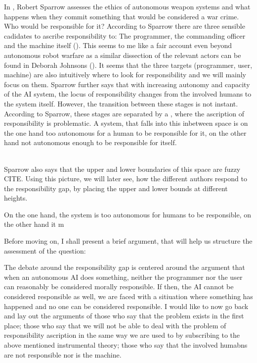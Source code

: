 \documentclass{article}
\begin{document}
In , Robert Sparrow assesses the ethics of
autonomous weapon systems and what happens when they commit something that would
be considered a war crime. Who would be responsible for it? According to Sparrow
there are three sensible cadidates to ascribe responsibility to: The programmer,
the commanding officer and the machine itself (\cite[p.
69-71]{sparrow2007killer}). This seems to me like a fair account even beyond
autonomous robot warfare as a similar dissection of the relevant actors can be
found in Deborah Johnsons  (\cite[p.
202]{johnson2006computer}). It seems that the three targets (programmer, user,
machine) are also intuitively where to look for responsibility and we will mainly
focus on them. Sparrow further says that with increasing autonomy and capacity
of the AI system, the locus of responsibility changes from the involved humans
to the system itself. However, the transition between these stages is not
instant. According to Sparrow, these stages are separated by a , where the ascription of responsibility is problematic. A system, that
falls into this inbetween space is on the one hand too autonomous for a human to
be responsible for it, on the other hand not autonomous enough to be responsible
for itself.\\

\\

Sparrow also says that the upper and lower boundaries of this space are fuzzy
CITE. Using this picture, we will later see, how the different authors respond
to the responsibility gap, by placing the upper and lower bounds at different
heights.

On the one hand,
the system is too autonomous for humans to be responsible, on the other hand it
m



Before moving on, I shall present a brief argument, that will help us structure
the assessment of the question:

The debate around the responsibility gap is centered around the argument that
when an autonomous AI does something, neither the programmer nor the user can
reasonably be considered morally responsible. If then, the AI cannot be
considered responsible as well, we are faced with a sitiuation where something
has happened and no one can be considered responsible. I would like to now go
back and lay out the arguments of those who say that the problem exists in the
first place; those who say that we will not be able to deal with the problem of
responsibility ascription in the same way we are used to by subscribing to the
above mentioned instrumental theory; those who say that the involved humabns are
not responsible nor is the machine. 
\end{document}
